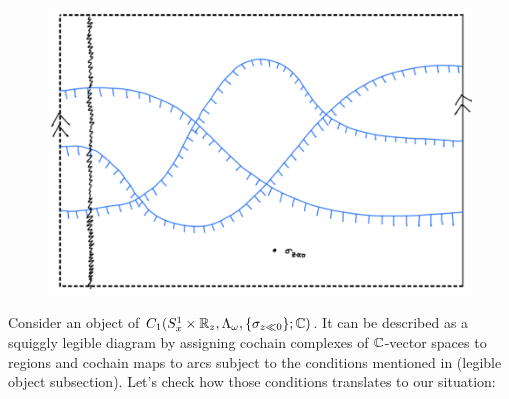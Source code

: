 \begin{figure}[H] 
    \centering
    \includegraphics[scale = 0.55]{diagrams/intro/8.png}
    \caption{}
    \label{fig:your-label}
\end{figure}
Consider an object of $C_1(S^1_x \times \mathbb{R}_z, \Lambda_\omega, \{\sigma_{z\ll 0}\};\mathbb{C})$. It can be described as a squiggly legible diagram by assigning cochain complexes of $\mathbb{C}$-vector spaces to regions and cochain maps to arcs subject to the conditions mentioned in (legible object subsection). Let's check how those conditions translates to our situation:
